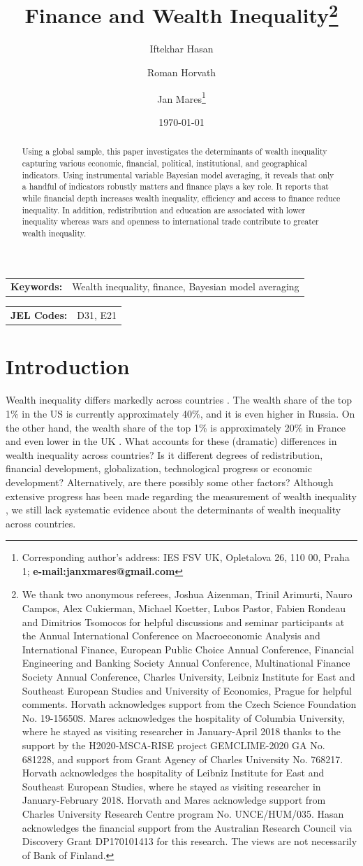 \documentclass[a4paper,11pt]{article}
\title{Finance and Wealth Inequality\thanks{We thank two anonymous referees, Joshua Aizenman, Trinil Arimurti, Nauro Campos, Alex Cukierman, Michael Koetter, Lubos Pastor, Fabien Rondeau and Dimitrios Tsomocos for helpful discussions and seminar participants at the Annual International Conference on Macroeconomic Analysis and International Finance, European Public Choice Annual Conference, Financial Engineering and Banking Society Annual Conference, Multinational Finance Society Annual Conference, Charles University, Leibniz Institute for East and Southeast European Studies and University of Economics, Prague for helpful comments. Horvath acknowledges support from the Czech Science Foundation No. 19-15650S. Mares acknowledges the hospitality of Columbia University, where he stayed as visiting researcher in January-April 2018 thanks to the support by the H2020-MSCA-RISE project GEMCLIME-2020 GA No. 681228, and support from Grant Agency of Charles University No. 768217. Horvath acknowledges the hospitality of Leibniz Institute for East and Southeast European Studies, where he stayed as visiting researcher in January-February 2018. Horvath and Mares acknowledge support from Charles University Research Centre program No. UNCE/HUM/035. Hasan acknowledges the financial support from the Australian Research Council via Discovery Grant DP170101413 for this research. The views are not necessarily of Bank of Finland.}}
\author[a,b,c]{Iftekhar Hasan}
\author[d,e]{Roman Horvath}
\author[d]{Jan Mares\footnote{\footnotesize Corresponding author's address: IES FSV UK, Opletalova 26, 110 00, Praha 1; \textbf{e-mail:janxmares@gmail.com}}}
\affil[a]{Fordham University}
\affil[b]{Bank of Finland}
\affil[c]{University of Sydney}
\affil[d]{Charles University, Prague}
\affil[e]{University of Ss. Cyril and Methodius in Trnava}
\date{\today}
\begin{document}
\def\sym#1{\ifmmode^{#1}\else\(^{#1}\)\fi} %

\maketitle

\begin{abstract}
Using a global sample, this paper investigates the determinants of wealth inequality capturing various economic, financial, political, institutional, and geographical indicators. Using instrumental variable Bayesian model averaging, it reveals that only a handful of indicators robustly matters and finance plays a key role. It reports that while financial depth increases wealth inequality, efficiency and access to finance reduce inequality. In addition, redistribution and education are associated with lower inequality whereas wars and openness to international trade contribute to greater wealth inequality.
\end{abstract}

\bigskip

\begin{tabular}{p{0.25\hsize}p{0.6\hsize}} %
\textbf{Keywords:} & Wealth inequality, finance, Bayesian model averaging
\end{tabular}

\bigskip

\begin{tabular}{p{0.25\hsize}p{0.6\hsize}}
\textbf{JEL Codes:} & D31, E21\\
\end{tabular}

\clearpage
\section{Introduction}
\label{sec:intro}

Wealth inequality differs markedly across countries \citep{daviesetal2011,daviesetal2017,milanovic2016global}. The wealth share of the top 1\% in the US is currently approximately 40\%, and it is even higher in Russia. On the other hand, the wealth share of the top 1\% is approximately 20\% in France and even lower in the UK \citep{zucman2018}. What accounts for these (dramatic) differences in wealth inequality across countries? Is it different degrees of redistribution, financial development, globalization, technological progress or economic development? Alternatively, are there possibly some other factors? Although extensive progress has been made regarding the measurement of wealth inequality  \citep{alvaredoetal2013,daviesetal2011,daviesetal2017,pikettyandzucman2014,SaezZucman2016}, we still lack systematic evidence about the determinants of wealth inequality across countries.
\end{document}
